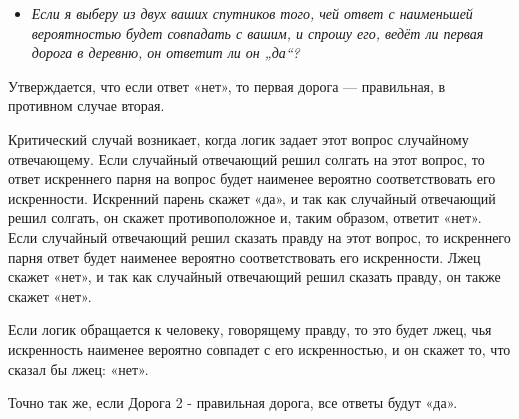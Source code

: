 \begin{itemize}
 \item[] \emph{Если я выберу из двух ваших спутников того, чей ответ с наименьшей вероятностью будет совпадать с вашим, и спрошу его, ведёт ли первая дорога в деревню, он ответит ли он „да“?}
\end{itemize}

Утверждается, что если ответ «нет», то первая дорога --- правильная, в противном случае вторая.

Критический случай возникает, когда логик задает этот вопрос случайному отвечающему. Если случайный отвечающий решил солгать на этот вопрос, то ответ искреннего парня на вопрос будет наименее вероятно соответствовать его искренности. Искренний парень скажет «да», и так как случайный отвечающий решил солгать, он скажет противоположное и, таким образом, ответит «нет». Если случайный отвечающий решил сказать правду на этот вопрос, то искреннего парня ответ будет наименее вероятно соответствовать его искренности. Лжец скажет «нет», и так как случайный отвечающий решил сказать правду, он также скажет «нет».

Если логик обращается к человеку, говорящему правду, то это будет лжец, чья искренность наименее вероятно совпадет с его искренностью, и он скажет то, что сказал бы лжец: «нет».

Точно так же, если Дорога 2 - правильная дорога, все ответы будут «да».
